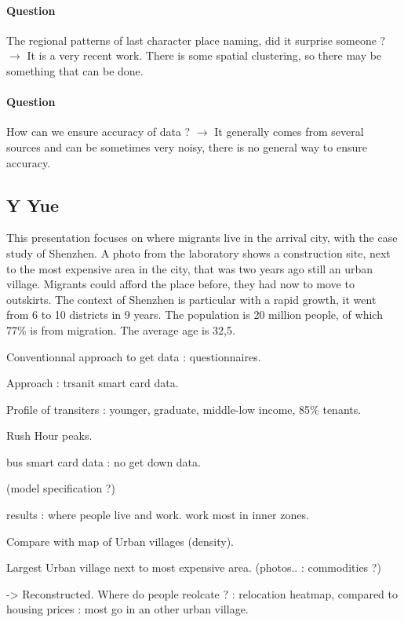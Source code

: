 \documentclass[11pt]{article}
\begin{document}
\paragraph{Question}

The regional patterns of last character place naming, did it surprise someone ? $\rightarrow$ It is a very recent work. There is some spatial clustering, so there may be something that can be done.

\paragraph{Question}

How can we ensure accuracy of data ? $\rightarrow$ It generally comes from several sources and can be sometimes very noisy, there is no general way to ensure accuracy.



\subsection*{Y Yue}


This presentation focuses on where migrants live in the arrival city, with the case study of Shenzhen. A photo from the laboratory shows a construction site, next to the most expensive area in the city, that was two years ago still an urban village. Migrants could afford the place before, they had now to move to outskirts. The context of Shenzhen is particular with a rapid growth, it went from 6 to 10 districts in 9 years. The population is 20 million people, of which 77\% is from migration. The average age is 32,5.

Conventionnal approach to get data : questionnaires.

Approach : trsanit smart card data. 

Profile of transiters : younger, graduate, middle-low income, 85\% tenants.

Rush Hour peaks.

bus smart card data : no get down data.

(model specification ?)

results : where people live and work. work most in inner zones.

Compare with map of Urban villages (density).

Largest Urban village next to most expensive area. (photos.. : commodities ?)

-> Reconstructed. Where do people reolcate ? : relocation heatmap, compared to housing prices : most go in an other urban village.
\end{document}
